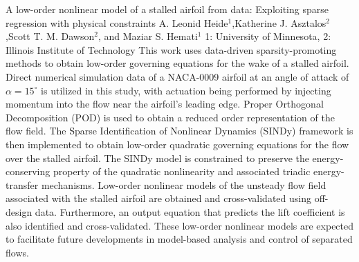 \begin{addmargin}[2em]{0em}
\vspace{1.5ex}
\abs
{A low-order nonlinear model of a stalled airfoil from data: Exploiting sparse regression with physical constraints}
{A. Leonid Heide$^{1}$,Katherine J. Asztalos$^{2}$,Scott T. M. Dawson$^{2}$, and Maziar S. Hemati$^{1}$}
{1: University of Minnesota, 2: Illinois Institute of Technology}
{This work uses data-driven sparsity-promoting methods to obtain low-order governing equations for the wake of a stalled airfoil.
Direct numerical simulation data of a NACA-0009 airfoil at an angle of attack of $\alpha=15^{\circ}$ is utilized in this study, with actuation being performed by injecting momentum into the flow near the airfoil’s leading edge.
Proper Orthogonal Decomposition (POD) is used to obtain a reduced order representation of the flow field.
The Sparse Identification of Nonlinear Dynamics (SINDy) framework is then implemented to obtain low-order quadratic governing equations for the  flow over the stalled airfoil.
The SINDy model is constrained to preserve the energy-conserving property of the quadratic nonlinearity and associated triadic energy-transfer mechanisms.
Low-order nonlinear models of the unsteady flow field associated with the stalled airfoil are obtained and cross-validated using off-design data.
Furthermore, an output equation that predicts the lift coefficient is also identified and cross-validated.
These low-order nonlinear models are expected to facilitate future developments in model-based analysis and control of separated flows.}



\end{addmargin}
